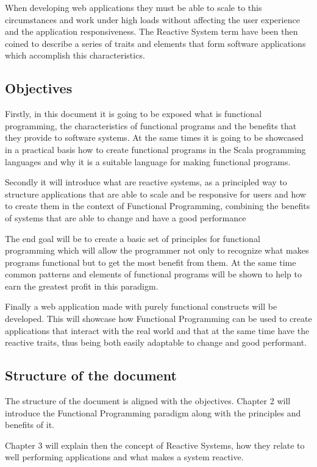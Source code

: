 \documentclass[../main.tex]{subfiles}
\begin{document}
When developing web applications they must be able to scale to this
circumstances and work under high loads without affecting the user experience
and the application responsiveness. The Reactive System term have been then coined to
describe a series of traits and elements that form software applications which
accomplish this characteristics.

\subsection{Objectives}
Firstly, in this document it is going to be exposed what is functional
programming, the characteristics of functional programs and the benefits that
they provide to software systems. At the same times it is going to be showcased
in a practical basis how to create functional programs in the Scala programming
languages and why it is a suitable language for making functional programs.

Secondly it will introduce what are reactive systems, as a principled way to
structure applications that are able to scale and be responsive for users and how to
create them in the context of Functional Programming, combining the benefits of
systems that are able to change and have a good performance

The end goal will be to create a basic set of principles for functional
programming which will allow the programmer not only to recognize what makes
programs functional but to get the most benefit from them. At the same time common
patterns and elements of functional programs will be shown to help to earn the
greatest profit in this paradigm.

Finally a web application made with purely functional constructs will be
developed. This will showcase how Functional Programming can be used to create
applications that interact with the real world and that at the same time have
the reactive traits, thus being both easily adaptable to change and good performant.

\subsection{Structure of the document}
The structure of the document is aligned with the objectives. Chapter 2
will introduce the Functional Programming paradigm along with the principles and
benefits of it.

Chapter 3 will explain then the concept of Reactive Systems, how they relate to
well performing applications and what makes a system reactive.
\end{document}
